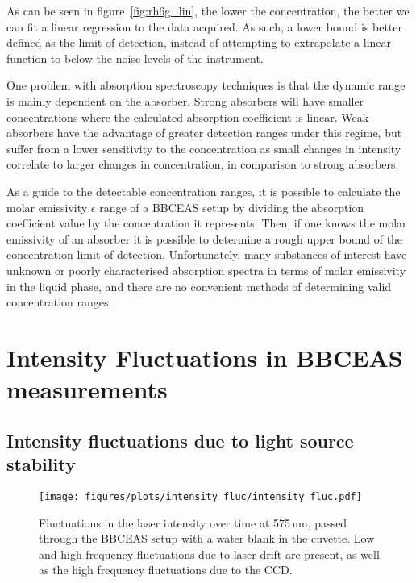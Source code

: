 As can be seen in figure~\ref{fig:rh6g_lin}, the lower the concentration, the
better we can fit a linear regression to the data acquired. As such, a lower
bound is better defined as the limit of detection, instead of attempting to
extrapolate a linear function to below the noise levels of the instrument.

One problem with absorption spectroscopy techniques is that the dynamic range
is mainly dependent on the absorber. Strong absorbers will have smaller
concentrations where the calculated absorption coefficient is linear. Weak
absorbers have the advantage of greater detection ranges under this regime,
but suffer from a lower sensitivity to the concentration as small changes
in intensity correlate to larger changes in concentration, in comparison to
strong absorbers.

As a guide to the detectable concentration ranges, it is possible to calculate
the molar emissivity $\epsilon$ range of a \ac{BBCEAS} setup by dividing the
absorption coefficient value by the concentration it represents. Then, if
one knows the molar emissivity of an absorber it is possible to determine a
rough upper bound of the concentration limit of detection. Unfortunately, many
substances of interest have unknown or poorly characterised absorption spectra
in terms of molar emissivity in the liquid phase, and there are no convenient
methods of determining valid concentration ranges.

\section{Intensity Fluctuations in BBCEAS measurements}\label{sec:light_fluc}


\subsection{Intensity fluctuations due to light source stability}\label{subsec:laser_fluc}

\begin{figure}[t]
\begin{center}
  \texttt{[image: figures/plots/intensity\_fluc/intensity\_fluc.pdf]}
\end{center}
\caption[Intensity fluctuations through blank in \ac{BBCEAS} setup]{Fluctuations in the laser intensity over time at 575\,nm, passed through the \ac{BBCEAS} setup with a water blank in the cuvette. Low and high frequency fluctuations due to laser drift are present, as well as the high frequency fluctuations due to the \ac{CCD}.}
\label{fig:laser_fluc}
\end{figure}


